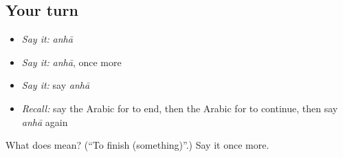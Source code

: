 \subsection*{Your turn}
\begin{itemize}
\raggedright
  \item \emph{Say it:} \emph{anhā}
  \item \emph{Say it:} \emph{anhā}, once more
  \item \emph{Say it:} say \emph{anhā}
  \item \emph{Recall:} say the Arabic for to end, then the Arabic for to continue, then say \emph{anhā} again
\end{itemize}

\begin{tcolorbox}[breakable,colback=teal!4,colframe=teal!35!black,title={Before you move on}]
What does  mean? (\textquotedblleft{}To finish (something)\textquotedblright{}.) Say it once more.
\end{tcolorbox}
